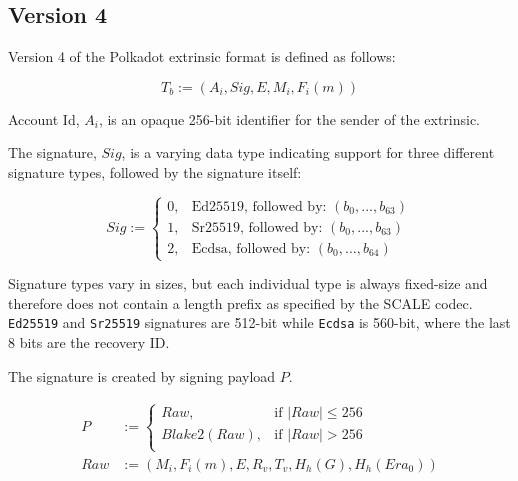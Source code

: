 \subsection{Version 4}

Version 4 of the Polkadot extrinsic format is defined as follows:

\[
    T_b := (A_i, Sig, E, M_i, F_i(m))
\]

\begin{definition}
    Account Id, $A_i$, is an opaque 256-bit identifier for the sender of the
    extrinsic.
\end{definition}

\begin{definition}
    The signature, $Sig$, is a varying data type indicating support for three
    different signature types, followed by the signature itself:

    \[
        Sig :=
        \begin{cases}
        0, & \text{Ed25519, followed by: } (b_0, ...,b_{63}) \\
        1, & \text{Sr25519, followed by: } (b_0, ...,b_{63}) \\
        2, & \text{Ecdsa, followed by: } (b_0, ...,b_{64})
        \end{cases}
    \]

    Signature types vary in sizes, but each individual type is always fixed-size
    and therefore does not contain a length prefix as specified by the SCALE
    codec. \verb|Ed25519| and \verb|Sr25519| signatures are 512-bit while
    \verb|Ecdsa| is 560-bit, where the last 8 bits are the recovery ID.
    \newline

    The signature is created by signing payload $P$.

    \begin{equation}
        \begin{aligned}
        P &:= \begin{cases}
            Raw, & \text{if } |Raw| \leq 256\\
            Blake2(Raw), & \text{if } |Raw| > 256\\
        \end{cases}\\
        Raw &:= (M_i, F_i(m), E, R_v, T_v, H_h(G), H_h(Era_0))\\
        \end{aligned}
    \end{equation}


\end{definition}
